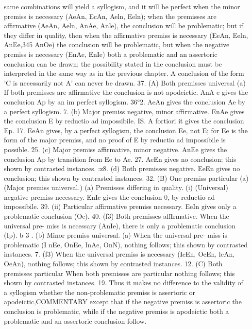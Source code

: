 {{{{{same combinations will yield a syllogism, and it will be perfect
when the minor premiss is necessary (AeAn, EcAn, Aeln, Eeln);
when the premisses are affirmative (AeAn, Aeln, AnAe, Anle), the
conclusion will be problematic; but if they differ in quality, then
when the affirmative premiss is necessary (EeAn, Eeln, AnEe,345
AnOe) the conclusion will be problematic, but when the negative
premiss is necessary (EnAe, EnIe) both a problematic and an
assertoric conclusion can be drawn; the possibility stated in the
conclusion must be interpreted in the same way as in the previous
chapter. A conclusion of the form 'C is necessarily not A' can
never be drawn.
37.
(A) Both premisses universal
(a) If both premisses are affirmative the conclusion is not
apodeictic. AnA e gives the conclusion Ap by an im perfect syllogism.
36°2. AeAn gives the conclusion Ae by a perfect syllogism.
7. (b) Major premiss negative, minor affirmative. EnAe gives
the conclusion E by reductio ad impossibile.
IS. A fortiori it gives the conclusion Ep.
17. EeAn gives, by a perfect syllogism, the conclusion Ee, not
E; for Ee is the form of the major premiss, and no proof of E by
reductio ad impossibile is possible.
25. (c) Major premiss affirmative, minor negative. AnEe gives
the conclusion Ap by transition from Ee to Ae.
27. AeEn gives no conclusion; this shown by contrasted
instances.
:z8. (d) Both premisses negative. EeEn gives no conclusion;
this shown by contrasted instances.
32.
(B) One premiss particular
(a) (Major premiss universal.)
(a) Premisses differing in
quality. (i) (Universal) negative premiss necessary. EnIc gives
the conclusion 0, by reductio ad impossibile.
39. (ii) Particular affirmative premiss necessary. EeIn gives
only a problematic conclusion (Oe).
40. (f3) Both premisses affIrmative. When the universal pre-
miss is necessary (AnIe), there is only a problematic conclusion (Ip).
b 3 . (b) Minor premiss universal. (a) When the universal pre-
miss is problematic (I nEe, OnEe, InAe, OnN), nothing follows;
this shown by contrasted instances.
7. (f3) When the universal premiss is necessary (IcEn, OeEn,
leAn, OeAn), nothing follows; this shown by contrasted instances.
12.
(C) Both premisses particular
When both premisses are particular nothing follows; this shown
by contrasted instances.
19. Thus it makes no difference to the validity of a syllogism
whether the non-problematic premiss is assertoric or apodeictic,COMMENTARY
except that if the negative premiss is assertoric the conclusion is
problematic, while if the negative premiss is apodeictic both a
problematic and an assertoric conclusion follow.
}}}}}
